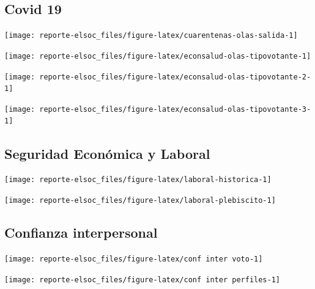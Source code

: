 \documentclass[
  12pt,
]{book}
\begin{document}
\hypertarget{covid-19}{%
\subsection{Covid 19}\label{covid-19}}

\begin{center}\texttt{[image: reporte-elsoc\_files/figure-latex/cuarentenas-olas-salida-1]} \end{center}

\begin{center}\texttt{[image: reporte-elsoc\_files/figure-latex/econsalud-olas-tipovotante-1]} \end{center}

\begin{center}\texttt{[image: reporte-elsoc\_files/figure-latex/econsalud-olas-tipovotante-2-1]} \end{center}

\begin{center}\texttt{[image: reporte-elsoc\_files/figure-latex/econsalud-olas-tipovotante-3-1]} \end{center}

\hypertarget{seguridad-econuxf3mica-y-laboral}{%
\subsection{Seguridad Económica y Laboral}\label{seguridad-econuxf3mica-y-laboral}}

\begin{center}\texttt{[image: reporte-elsoc\_files/figure-latex/laboral-historica-1]} \end{center}

\begin{center}\texttt{[image: reporte-elsoc\_files/figure-latex/laboral-plebiscito-1]} \end{center}

\hypertarget{confianza-interpersonal}{%
\subsection{Confianza interpersonal}\label{confianza-interpersonal}}

\begin{center}\texttt{[image: reporte-elsoc\_files/figure-latex/conf inter voto-1]} \end{center}

\begin{center}\texttt{[image: reporte-elsoc\_files/figure-latex/conf inter perfiles-1]} \end{center}
\end{document}
